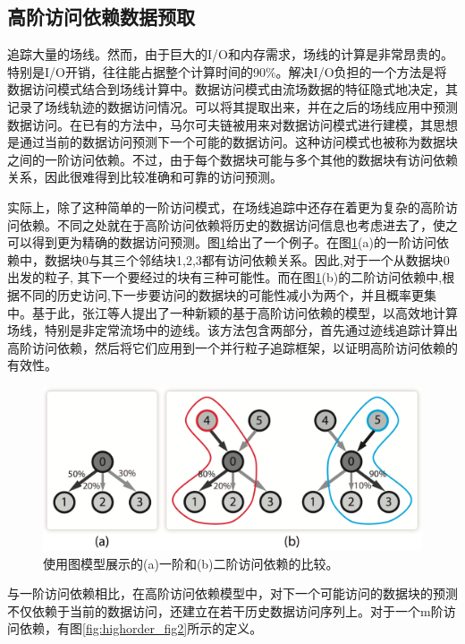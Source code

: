 \subsection{高阶访问依赖数据预取}

追踪大量的场线。然而，由于巨大的I/O和内存需求，场线的计算是非常昂贵的。特别是I/O开销，往往能占据整个计算时间的90\%。解决I/O负担的一个方法是将数据访问模式结合到场线计算中。数据访问模式由流场数据的特征隐式地决定，其记录了场线轨迹的数据访问情况。可以将其提取出来，并在之后的场线应用中预测数据访问。在已有的方法中，马尔可夫链被用来对数据访问模式进行建模，其思想是通过当前的数据访问预测下一个可能的数据访问。这种访问模式也被称为数据块之间的一阶访问依赖。不过，由于每个数据块可能与多个其他的数据块有访问依赖关系，因此很难得到比较准确和可靠的访问预测。

实际上，除了这种简单的一阶访问模式，在场线追踪中还存在着更为复杂的高阶访问依赖。不同之处就在于高阶访问依赖将历史的数据访问信息也考虑进去了，使之可以得到更为精确的数据访问预测。图\ref{fig:highorder_fig1}给出了一个例子。在图\ref{fig:highorder_fig1}(a)的一阶访问依赖中，数据块0与其三个邻结块1,2,3都有访问依赖关系。因此,对于一个从数据块0出发的粒子, 其下一个要经过的块有三种可能性。而在图\ref{fig:highorder_fig1}(b)的二阶访问依赖中,根据不同的历史访问,下一步要访问的数据块的可能性减小为两个，并且概率更集中。基于此，张江等人提出了一种新颖的基于高阶访问依赖的模型，以高效地计算场线，特别是非定常流场中的迹线。该方法包含两部分，首先通过迹线追踪计算出高阶访问依赖，然后将它们应用到一个并行粒子追踪框架，以证明高阶访问依赖的有效性。

\begin{figure}[!tb]
  \centering
  \includegraphics[width=.7\linewidth]{image/prefetch/highorder_fig1.png}
  \caption{
    使用图模型展示的(a)一阶和(b)二阶访问依赖的比较\parencite{ZhangGY16}。
  }
  \label{fig:highorder_fig1}
\end{figure}

与一阶访问依赖相比，在高阶访问依赖模型中，对下一个可能访问的数据块的预测不仅依赖于当前的数据访问，还建立在若干历史数据访问序列上。对于一个m阶访问依赖，有图\ref{fig:highorder_fig2}所示的定义。

